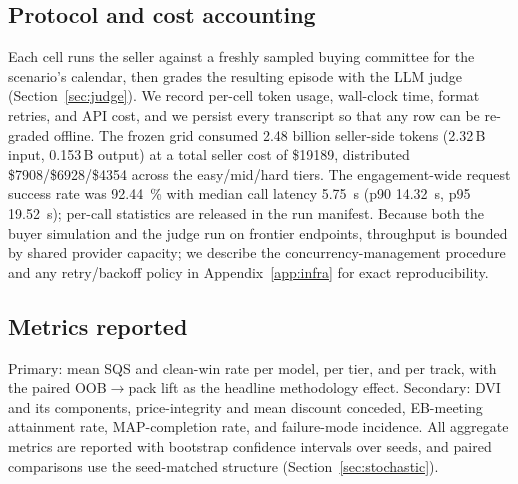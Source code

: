\subsection{Protocol and cost accounting}
Each cell runs the seller against a freshly sampled buying committee for the
scenario's calendar, then grades the resulting episode with the LLM judge
(Section~\ref{sec:judge}). We record per-cell token usage, wall-clock time, format
retries, and API cost, and we persist every transcript so that any row can be
re-graded offline. The frozen grid consumed \num{2.48} billion seller-side tokens
(\num{2.32}\,B input, \num{0.153}\,B output) at a total seller cost of
\$\num{19189}, distributed \$\num{7908}/\$\num{6928}/\$\num{4354} across the
easy/mid/hard tiers. The engagement-wide request success rate was
\SI{92.44}{\percent} with median call latency \SI{5.75}{\second}
(p90 \SI{14.32}{\second}, p95 \SI{19.52}{\second}); per-call statistics are released
in the run manifest. Because both
the buyer simulation and the judge
run on frontier endpoints, throughput is bounded by shared provider capacity; we
describe the concurrency-management procedure and any retry/backoff policy in
Appendix~\ref{app:infra} for exact reproducibility.

\subsection{Metrics reported}
Primary: mean SQS and clean-win rate per model, per tier, and per track, with the
paired OOB$\to$pack lift as the headline methodology effect. Secondary: DVI and its
components, price-integrity and mean discount conceded, EB-meeting attainment
rate, MAP-completion rate, and failure-mode incidence. All aggregate metrics are
reported with bootstrap confidence intervals over seeds, and paired comparisons
use the seed-matched structure (Section~\ref{sec:stochastic}).
